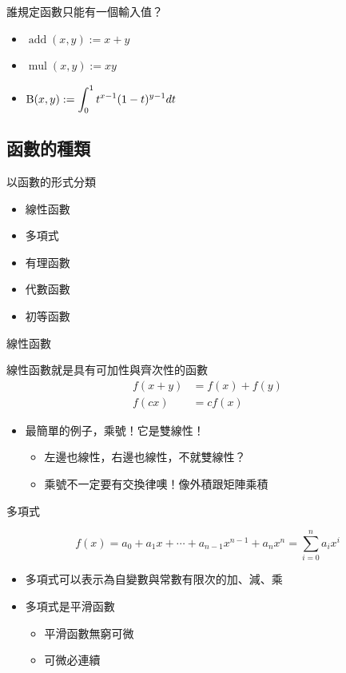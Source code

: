 \documentclass{beamer}
\begin{document}
\begin{CJK}{UTF8}{bsmi}
\begin{frame}{誰規定函數只能有一個輸入值？}
  \begin{itemize}
    \item $\operatorname{add}(x,y) := x + y$
    \item $\operatorname{mul}(x,y) := xy$
    \item $\displaystyle \textup{B}(x,y) := \int_0^1 t^{x-1} (1-t)^{y-1} dt$
  \end{itemize}
\end{frame}

\subsection{函數的種類}
\begin{frame}{以函數的形式分類}
  \begin{itemize}
    \item 線性函數
    \item 多項式
    \item 有理函數
    \item 代數函數
    \item 初等函數
  \end{itemize}
\end{frame}

\begin{frame}{線性函數}
  \begin{definition}
    線性函數就是具有可加性與齊次性的函數
    \begin{align*}
      f(x + y) &= f(x) + f(y)\\
      f(cx) &= cf(x)
    \end{align*}
  \end{definition}
  \begin{itemize}
    \item 最簡單的例子，乘號！它是雙線性！
    \begin{itemize}
      \item 左邊也線性，右邊也線性，不就雙線性？
      \item 乘號不一定要有交換律噢！像外積跟矩陣乘積
    \end{itemize}
  \end{itemize}
\end{frame}

\begin{frame}{多項式}
  \begin{definition}
    \[f(x) = a_0 + a_1 x + \cdots + a_{n-1} x^{n-1} + a_n x^n = \sum_{i=0}^{n} a_i x^i\]
  \end{definition}
  \begin{itemize}
    \item 多項式可以表示為自變數與常數有限次的加、減、乘
    \item 多項式是平滑函數
    \begin{itemize}
      \item 平滑函數無窮可微
      \item 可微必連續
    \end{itemize}
  \end{itemize}
\end{frame}


\end{CJK}
\end{document}

